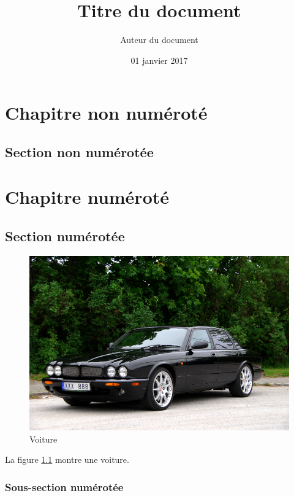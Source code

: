 \documentclass[a4paper,12pt]{report}
\begin{document}

\title{Titre du document}
\date{01 janvier 2017}
\author{Auteur du document}
	
\maketitle

\tableofcontents
\listoffigures

\pagestyle{fancy}
\chapter*{Chapitre non numéroté}
\lipsum

\section*{Section non numérotée}
\lipsum

\chapter{Chapitre numéroté}
\section{Section numérotée}
\begin{multicols}{2}
\lipsum
\end{multicols}

\begin{figure}
	\centering
	\includegraphics[width=1.0\textwidth]{images/xjr.jpg}
	\caption{Voiture}
	\label{fig:xjr}
\end{figure}

La figure \ref{fig:xjr} montre une voiture.


\subsection{Sous-section numérotée}
\lipsum
\end{document}
